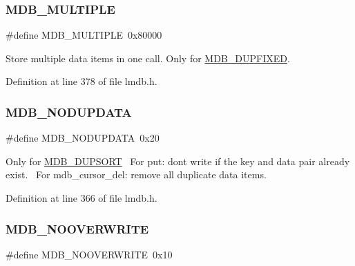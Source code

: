 \subsubsection{\texorpdfstring{M\+D\+B\+\_\+\+M\+U\+L\+T\+I\+P\+LE}{MDB\_MULTIPLE}}
{\footnotesize\ttfamily \#define M\+D\+B\+\_\+\+M\+U\+L\+T\+I\+P\+LE~0x80000}

Store multiple data items in one call. Only for \mbox{\hyperlink{group__mdb__dbi__open_ga5acc26f80668d1ebc31265d178c69338}{M\+D\+B\+\_\+\+D\+U\+P\+F\+I\+X\+ED}}. 

Definition at line 378 of file lmdb.\+h.

\mbox{\label{group__mdb__put_ga8d723ae10cf0afdc771ce5eafa8f6c9e}} 
\subsubsection{\texorpdfstring{M\+D\+B\+\_\+\+N\+O\+D\+U\+P\+D\+A\+TA}{MDB\_NODUPDATA}}
{\footnotesize\ttfamily \#define M\+D\+B\+\_\+\+N\+O\+D\+U\+P\+D\+A\+TA~0x20}

Only for \mbox{\hyperlink{group__mdb__dbi__open_gae0626566c2562e9007f5c8c9535bab1a}{M\+D\+B\+\_\+\+D\+U\+P\+S\+O\+RT}}~\newline
 For put\+: don\textquotesingle{}t write if the key and data pair already exist.~\newline
 For mdb\+\_\+cursor\+\_\+del\+: remove all duplicate data items. 

Definition at line 366 of file lmdb.\+h.

\mbox{\label{group__mdb__put_ga23eb9813f9a4cdf7a7da5e01815b0cfb}} 
\subsubsection{\texorpdfstring{M\+D\+B\+\_\+\+N\+O\+O\+V\+E\+R\+W\+R\+I\+TE}{MDB\_NOOVERWRITE}}
{\footnotesize\ttfamily \#define M\+D\+B\+\_\+\+N\+O\+O\+V\+E\+R\+W\+R\+I\+TE~0x10}


